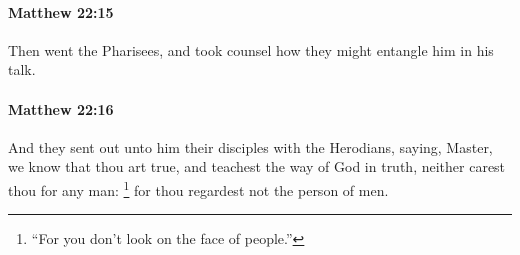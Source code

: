 		\paragraph{Matthew 22:15} %
			\label{MATTHEW-22-15}

			Then went the Pharisees, and took counsel how they might entangle him in his talk.

			\begin{framed}
			\scriptsize
				\begin{compactdesc}
					\item[SBLG] 
				\end{compactdesc}
			\end{framed}

		\paragraph{Matthew 22:16} %
			\label{MATTHEW-22-16}

			And they sent out unto him their disciples with the Herodians, saying, Master, we know that thou art true, and teachest the way of God in truth, neither carest thou for any man:
				\footnote{%
					``For you don't look on the face of people.''
					}%
			for thou regardest not the person of men.

